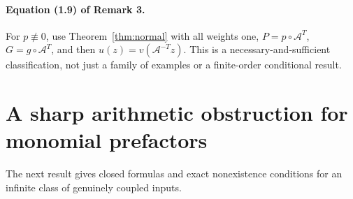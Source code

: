 \documentclass[11pt]{article}
\numberwithin{equation}{section}
\theoremstyle{definition}\newtheorem{definition}[theorem]{Definition}
\theoremstyle{remark}\newtheorem{remark}[theorem]{Remark}
\newcommand{\Ac}{\mathcal A}
\begin{document}
\paragraph{Equation (1.9) of Remark 3.}
For $p\not\equiv0$, use Theorem~\ref{thm:normal} with all weights one,
$P=p\circ\Ac^T$, $G=g\circ\Ac^T$, and then $u(z)=v(\Ac^{-T}z)$.
This is a necessary-and-sufficient classification, not just a family of
examples or a finite-order conditional result.

\section{A sharp arithmetic obstruction for monomial prefactors}
The next result gives closed formulas and exact nonexistence conditions
for an infinite class of genuinely coupled inputs.
\end{document}
